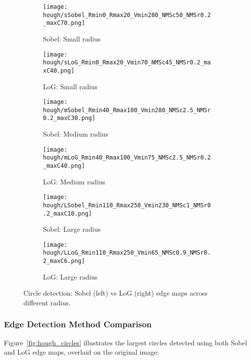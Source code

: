 \documentclass[12pt,a4paper]{article}
\begin{document}
\begin{figure}[H]
    \centering
    \begin{subfigure}{0.48\textwidth}
        \texttt{[image: hough/sSobel\_Rmin0\_Rmax20\_Vmin280\_NMSc50\_NMSr0.2\_maxC70.png]}
        \caption{Sobel: Small radius}
    \end{subfigure}
    \hfill
    \begin{subfigure}{0.48\textwidth}
        \texttt{[image: hough/sLoG\_Rmin0\_Rmax20\_Vmin70\_NMSc45\_NMSr0.2\_maxC40.png]}
        \caption{LoG: Small radius}
    \end{subfigure}
    
    \vspace{0.5cm}
    
    \begin{subfigure}{0.48\textwidth}
        \texttt{[image: hough/mSobel\_Rmin40\_Rmax100\_Vmin280\_NMSc2.5\_NMSr0.2\_maxC30.png]}
        \caption{Sobel: Medium radius}
    \end{subfigure}
    \hfill
    \begin{subfigure}{0.48\textwidth}
        \texttt{[image: hough/mLoG\_Rmin40\_Rmax100\_Vmin75\_NMSc2.5\_NMSr0.2\_maxC40.png]}
        \caption{LoG: Medium radius}
    \end{subfigure}
    
    \vspace{0.5cm}
    
    \begin{subfigure}{0.48\textwidth}
        \texttt{[image: hough/LSobel\_Rmin110\_Rmax250\_Vmin230\_NMSc1\_NMSr0.2\_maxC10.png]}
        \caption{Sobel: Large radius}
    \end{subfigure}
    \hfill
    \begin{subfigure}{0.48\textwidth}
        \texttt{[image: hough/LLoG\_Rmin110\_Rmax250\_Vmin65\_NMSc0.9\_NMSr0.2\_maxC6.png]}
        \caption{LoG: Large radius}
    \end{subfigure}

    \caption{Circle detection: Sobel (left) vs LoG (right) edge maps across different radius.}
    \label{fig:radius_comparisons}

\end{figure}


\subsubsection*{Edge Detection Method Comparison}
Figure~\ref{fig:hough_circles} illustrates the largest circles detected using both Sobel and LoG edge maps, overlaid on the original image:
\end{document}

